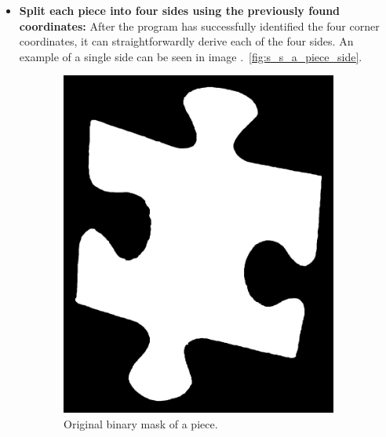 \documentclass{article}
\begin{document}
\begin{itemize}
  \item \textbf{Split each piece into four sides using the previously found coordinates:}\newline
	After the program has successfully identified the four corner coordinates,
  it can straightforwardly derive each of the four sides.
  An example of a single side can be seen in image .~\cref{fig:s_s_a_piece_side}.
\end{itemize}

\begin{figure}
  \begin{subfigure}{0.3\textwidth}
    \centering
    \includegraphics[width=\linewidth]{pictures/original_piece.jpeg}
    \caption{Original binary mask of a piece.}
    \label{fig:s_s_og}
  \end{subfigure}
  \hfill
  \begin{subfigure}{0.3\textwidth}
    \centering

\end{subfigure}
\end{figure}
\end{document}
